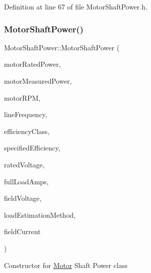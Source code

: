 Definition at line 67 of file Motor\+Shaft\+Power.\+h.

\mbox{\label{class_motor_shaft_power_acf65f63b1c78946df0987dd1a9a98c77}} 
\subsubsection{\texorpdfstring{Motor\+Shaft\+Power()}{MotorShaftPower()}\hspace{0.1cm}{\footnotesize\ttfamily [3/3]}}
{\footnotesize\ttfamily Motor\+Shaft\+Power\+::\+Motor\+Shaft\+Power (\begin{DoxyParamCaption}\item[{const double}]{motor\+Rated\+Power,  }\item[{const double}]{motor\+Measured\+Power,  }\item[{const double}]{motor\+R\+PM,  }\item[{const Motor\+::\+Line\+Frequency}]{line\+Frequency,  }\item[{const Motor\+::\+Efficiency\+Class}]{efficiency\+Class,  }\item[{const double}]{specified\+Efficiency,  }\item[{const double}]{rated\+Voltage,  }\item[{const double}]{full\+Load\+Amps,  }\item[{const double}]{field\+Voltage,  }\item[{const Motor\+::\+Load\+Estimation\+Method}]{load\+Estimation\+Method,  }\item[{const double}]{field\+Current }\end{DoxyParamCaption})\hspace{0.3cm}{\ttfamily [inline]}}

Constructor for \hyperlink{struct_motor}{Motor} Shaft Power class


